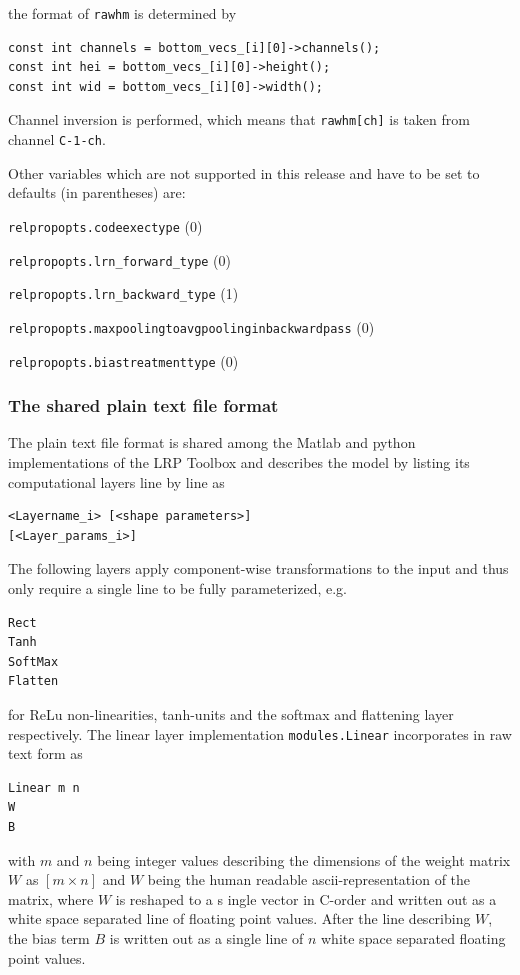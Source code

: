 \documentclass[a4wide]{article}
\begin{document}
\begin{itemize}
the format of \texttt{rawhm} is determined by
\begin{verbatim}
const int channels = bottom_vecs_[i][0]->channels();
const int hei = bottom_vecs_[i][0]->height();
const int wid = bottom_vecs_[i][0]->width();
\end{verbatim}

Channel inversion is performed, which means that \texttt{rawhm[ch]} is taken from channel \texttt{C-1-ch}.

Other variables which are not supported in this release and have to be set to defaults (in parentheses) are:

\texttt{relpropopts.codeexectype} (0)

\texttt{relpropopts.lrn\_forward\_type} (0)

\texttt{relpropopts.lrn\_backward\_type} (1)

\texttt{relpropopts.maxpoolingtoavgpoolinginbackwardpass} (0)

\texttt{relpropopts.biastreatmenttype} (0)




\end{itemize}



\subsubsection*{The shared plain text file format}


		The plain text file format is shared among the Matlab and python implementations of the LRP Toolbox and describes
        the model by listing its computational layers line by line as

        \begin{verbatim}
<Layername_i> [<shape parameters>]
[<Layer_params_i>]
        \end{verbatim}

     	The following layers apply component-wise transformations to the input and thus only require a single line to be fully parameterized, e.g.

     	\begin{verbatim}
Rect
Tanh
SoftMax
Flatten
        \end{verbatim}
        for ReLu non-linearities, tanh-units and the softmax and flattening layer respectively. The linear layer implementation \texttt{modules.Linear} incorporates in raw text form as
        \begin{verbatim}
Linear m n
W
B
       \end{verbatim}
        with $m$ and $n$ being integer values describing the dimensions of the weight matrix $W$ as $[m \times n]$ and
        $W$ being the human readable ascii-representation of the matrix, where $W$ is reshaped to a s	ingle vector in C-order and written out as a
        white space separated line of floating point values.
        After the line describing $W$, the bias term $B$ is written out as a single line of $n$ white space separated floating point values.
\end{document}
